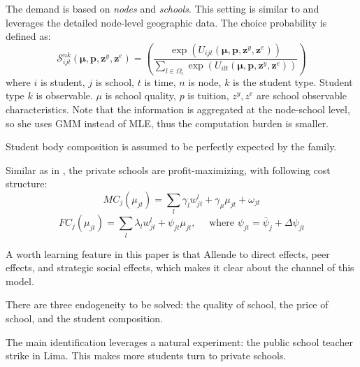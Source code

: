 
The demand is based on \textit{nodes} and \textit{schools}. 
This setting is similar to \citet{Neilson2018} and leverages the detailed node-level geographic data.
The choice probability is defined as:
\[
    \mathcal{S}_{i j t}^{n k}\left(\boldsymbol{\mu}, \mathbf{p}, \mathbf{z}^{y}, \mathbf{z}^{e}\right)=\left(\frac{\exp \left(U_{i j t}\left(\boldsymbol{\mu}, \mathbf{p}, \mathbf{z}^{y}, \mathbf{z}^{e}\right)\right)}{\sum_{l \in \Omega_{i}} \exp \left(U_{i l t}\left(\boldsymbol{\mu}, \mathbf{p}, \mathbf{z}^{y}, \mathbf{z}^{e}\right)\right)}\right)
\]
where $i$ is student, $j$ is school, $t$ is time, $n$ is node, $k$ is the student type. 
Student type $k$ is observable. $\mu$ is school quality, $p$ is tuition, $z^y, z^e$ are school observable characteristics.
Note that the information is aggregated at the node-school level, so she uses GMM instead of MLE, thus the computation burden is smaller.

Student body composition is assumed to be perfectly expected by the family.


Similar as in \citet{Neilson2018}, the private schools are profit-maximizing, with following cost structure:
\[
    M C_{j}\left(\mu_{j t}\right)=\sum_{l} \gamma_{l} w_{j t}^{l}+\gamma_{\mu} \mu_{j t}+\omega_{j t}
\]
\[
    F C_{j}\left(\mu_{j t}\right)=\sum_{l} \lambda_{l} w_{j t}^{l}+\psi_{j t} \mu_{j t}, \quad \text { where } \psi_{j t}=\bar{\psi}_{j}+\Delta \psi_{j t}
\]

A worth learning feature in this paper is that Allende  to direct effects, peer effects, and strategic social effects, which makes it clear about the channel of this model.


There are three endogeneity to be solved: the quality of school, the price of school, and the student composition.

The main identification leverages a natural experiment: the public school teacher strike in Lima. This makes more students turn to private schools.

